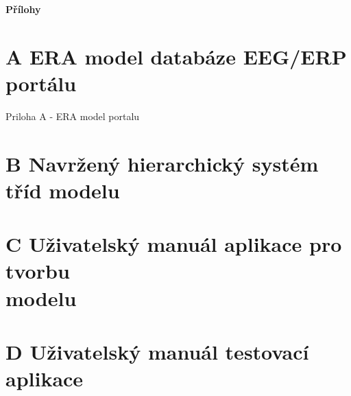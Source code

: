 \documentclass{projekt}
\begin{document}
\noindent
{\bf \LARGE Přílohy}
\setcounter{chapter}{1}

\newpage
\thispagestyle{plain}
\section*{{\LARGE A} ERA model databáze EEG/ERP portálu}
\hspace{0.65cm}Priloha A - ERA model portalu

\section*{{\LARGE B} Navržený hierarchický systém tříd modelu}
\section*{{\LARGE C} Uživatelský manuál aplikace pro tvorbu \\modelu}
\section*{{\LARGE D} Uživatelský manuál testovací aplikace}
\end{document}
